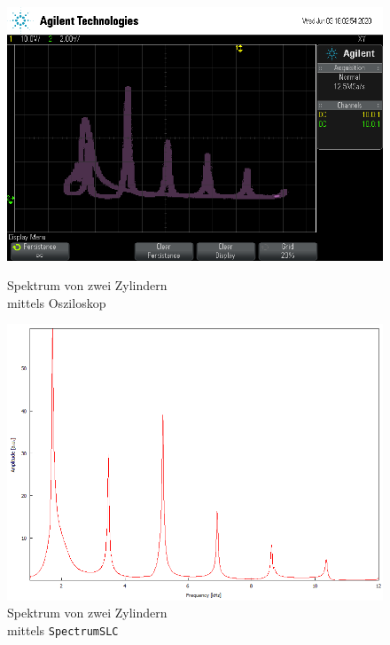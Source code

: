 \begin{figure}
    \begin{minipage}[b]{.4\linewidth} %
        \includegraphics[width=\linewidth]{figure/2Zylinder.png}
        \vspace*{0.008cm}
        \caption{Spektrum von zwei Zylindern\\ mittels Osziloskop}
     \end{minipage}
     \hspace{.1\linewidth}%
     \begin{minipage}[b]{.4\linewidth} %
        \includegraphics[width=\linewidth]{figure/2_Zylinder.png}
        \caption{Spektrum von zwei Zylindern\\ mittels \texttt{SpectrumSLC}}
     \end{minipage}
\end{figure}
